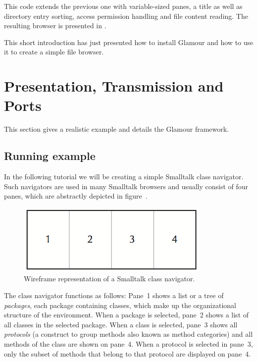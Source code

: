 \documentclass[a4paper,10pt,twoside]{book}
\begin{document}
This code extends the previous one with variable-sized panes, a title
as well as directory entry sorting, access permission handling and
file content reading. The resulting browser is presented in
.

This short introduction has just presented how to install Glamour and how to use
it to create a simple file browser. 

\section{Presentation, Transmission and Ports}

This section gives a realistic example and details the Glamour framework.

\subsection{Running example}
\label{sec:tutorial/getting_started}

In the following tutorial we will be creating a simple Smalltalk class
navigator. Such navigators are used in many Smalltalk browsers and
usually consist of four panes, which are abstractly depicted in
figure~.

\begin{figure}[htbp]
\centerline{\includegraphics[width=\linewidth]{classnavigator_wireframe.png}}
\caption{Wireframe representation of a Smalltalk class navigator.}
\label{fig:classnavigator_wireframe}
\end{figure}

The class navigator functions as follows: Pane~1 shows a list or a
tree of \emph{packages}, each package containing classes, which make up the
organizational structure of the environment. When a package is
selected, pane~2 shows a list of all classes in the selected
package. When a class is selected, pane~3 shows all \emph{protocols}
(a construct to group methods also known as method categories) and all
methods of the class are shown on pane~4. When a protocol is
selected in pane~3, only the subset of methods that belong to that
protocol are displayed on pane~4.
\end{document}
